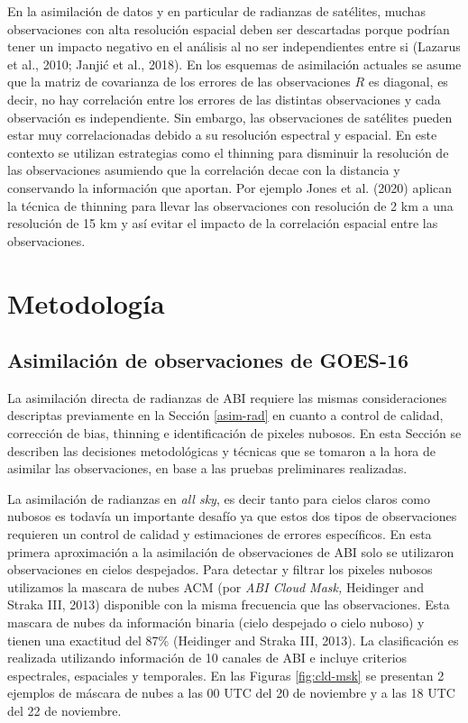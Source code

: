 \documentclass[12pt,oneside,a4paper]{reedthesis}
\begin{document}
En la asimilación de datos y en particular de radianzas de satélites, muchas observaciones con alta resolución espacial deben ser descartadas porque podrían tener un impacto negativo en el análisis al no ser independientes entre si (Lazarus et al., 2010; Janjić et al., 2018). En los esquemas de asimilación actuales se asume que la matriz de covarianza de los errores de las observaciones \(R\) es diagonal, es decir, no hay correlación entre los errores de las distintas observaciones y cada observación es independiente. Sin embargo, las observaciones de satélites pueden estar muy correlacionadas debido a su resolución espectral y espacial. En este contexto se utilizan estrategias como el thinning para disminuir la resolución de las observaciones asumiendo que la correlación decae con la distancia y conservando la información que aportan. Por ejemplo Jones et al. (2020) aplican la técnica de thinning para llevar las observaciones con resolución de 2 km a una resolución de 15 km y así evitar el impacto de la correlación espacial entre las observaciones.

\hypertarget{metodologuxeda-2}{%
\section{Metodología}\label{metodologuxeda-2}}

\hypertarget{asim-abi}{%
\subsection{Asimilación de observaciones de GOES-16}\label{asim-abi}}

La asimilación directa de radianzas de ABI requiere las mismas consideraciones descriptas previamente en la Sección \ref{asim-rad} en cuanto a control de calidad, corrección de bias, thinning e identificación de pixeles nubosos. En esta Sección se describen las decisiones metodológicas y técnicas que se tomaron a la hora de asimilar las observaciones, en base a las pruebas preliminares realizadas.

La asimilación de radianzas en \emph{all sky}, es decir tanto para cielos claros como nubosos es todavía un importante desafío ya que estos dos tipos de observaciones requieren un control de calidad y estimaciones de errores específicos. En esta primera aproximación a la asimilación de observaciones de ABI solo se utilizaron observaciones en cielos despejados. Para detectar y filtrar los pixeles nubosos utilizamos la mascara de nubes ACM (por \emph{ABI Cloud Mask,} Heidinger and Straka III, 2013) disponible con la misma frecuencia que las observaciones. Esta mascara de nubes da información binaria (cielo despejado o cielo nuboso) y tienen una exactitud del 87\% (Heidinger and Straka III, 2013). La clasificación es realizada utilizando información de 10 canales de ABI e incluye criterios espectrales, espaciales y temporales. En las Figuras \ref{fig:cld-msk} se presentan 2 ejemplos de máscara de nubes a las 00 UTC del 20 de noviembre y a las 18 UTC del 22 de noviembre.
\end{document}
